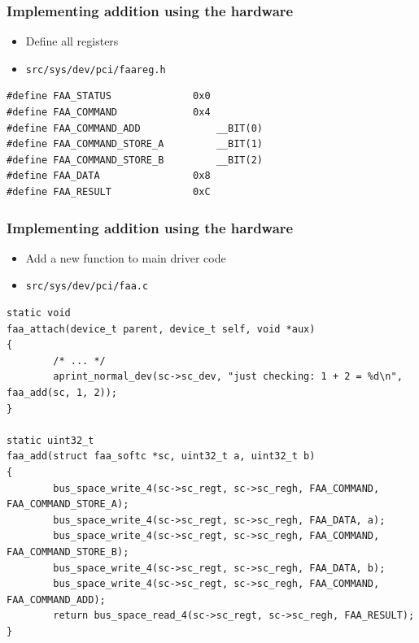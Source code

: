 \documentclass[dvipsnames,table]{beamer}
\begin{document}
\begin{frame}[fragile]
\frametitle{Implementing addition using the hardware}
\begin{itemize}
	\item Define all registers
	\item {\tt src/sys/dev/pci/faareg.h}
\end{itemize}
\begin{lstlisting}
#define FAA_STATUS              0x0
#define FAA_COMMAND             0x4
#define FAA_COMMAND_ADD             __BIT(0)        
#define FAA_COMMAND_STORE_A         __BIT(1)
#define FAA_COMMAND_STORE_B         __BIT(2)
#define FAA_DATA                0x8
#define FAA_RESULT              0xC
\end{lstlisting}
\end{frame}

\begin{frame}[fragile]
\frametitle{Implementing addition using the hardware}
\begin{itemize}
	\item Add a new function to main driver code
	\item {\tt src/sys/dev/pci/faa.c}
\end{itemize}
\begin{lstlisting}
static void
faa_attach(device_t parent, device_t self, void *aux)
{
        /* ... */
        aprint_normal_dev(sc->sc_dev, "just checking: 1 + 2 = %d\n", faa_add(sc, 1, 2));
}

static uint32_t
faa_add(struct faa_softc *sc, uint32_t a, uint32_t b)
{
        bus_space_write_4(sc->sc_regt, sc->sc_regh, FAA_COMMAND, FAA_COMMAND_STORE_A);
        bus_space_write_4(sc->sc_regt, sc->sc_regh, FAA_DATA, a);
        bus_space_write_4(sc->sc_regt, sc->sc_regh, FAA_COMMAND, FAA_COMMAND_STORE_B);
        bus_space_write_4(sc->sc_regt, sc->sc_regh, FAA_DATA, b);
        bus_space_write_4(sc->sc_regt, sc->sc_regh, FAA_COMMAND, FAA_COMMAND_ADD);
        return bus_space_read_4(sc->sc_regt, sc->sc_regh, FAA_RESULT);
}
\end{lstlisting}
\end{frame}
\end{document}
